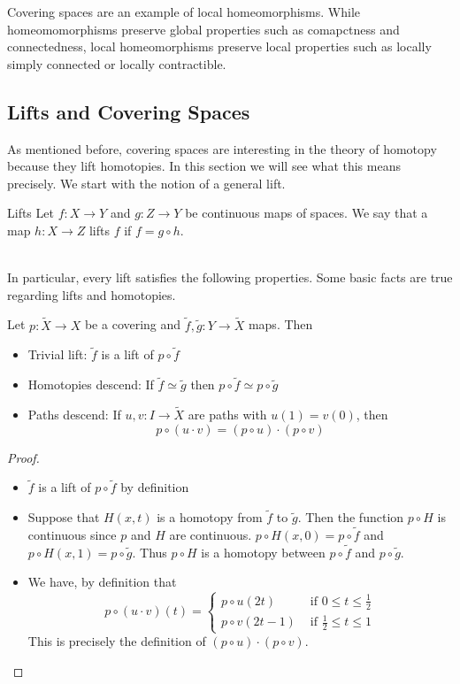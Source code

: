 \documentclass[a4paper]{article}
\begin{document}
Covering spaces are an example of local homeomorphisms. While homeomomorphisms preserve global properties such as comapctness and connectedness, local homeomorphisms preserve local properties such as locally simply connected or locally contractible. 

\subsection{Lifts and Covering Spaces}
As mentioned before, covering spaces are interesting in the theory of homotopy because they lift homotopies. In this section we will see what this means precisely. We start with the notion of a general lift. 

\begin{defn}{Lifts}{} Let $f:X\to Y$ and $g:Z\to Y$ be continuous maps of spaces. We say that a map $h:X\to Z$ lifts $f$ if $f=g\circ h$. \\~\\
\end{defn}

In particular, every lift satisfies the following properties. Some basic facts are true regarding lifts and homotopies. 

\begin{prp}{}{} Let $p:\tilde{X}\to X$ be a covering and $\tilde{f},\tilde{g}:Y\to\tilde{X}$ maps. Then 
\begin{itemize}
\item Trivial lift: $\tilde{f}$ is a lift of $p\circ\tilde{f}$
\item Homotopies descend: If $\tilde{f}\simeq\tilde{g}$ then $p\circ\tilde{f}\simeq p\circ\tilde{g}$
\item Paths descend: If $u,v:I\to\tilde{X}$ are paths with $u(1)=v(0)$, then $$p\circ(u\cdot v)=(p\circ u)\cdot(p\circ v)$$
\end{itemize} \tcbline
\begin{proof}~\\
\begin{itemize}
\item $\tilde{f}$ is a lift of $p\circ\tilde{f}$ by definition
\item Suppose that $H(x,t)$ is a homotopy from $\tilde{f}$ to $\tilde{g}$. Then the function $p\circ H$ is continuous since $p$ and $H$ are continuous. $p\circ H(x,0)=p\circ\tilde{f}$ and $p\circ H(x,1)=p\circ\tilde{g}$. Thus $p\circ H$ is a homotopy between $p\circ\tilde{f}$ and $p\circ\tilde{g}$. 
\item We have, by definition that $$p\circ(u\cdot v)(t)=\begin{cases}
p\circ u(2t) & \text{ if }0\leq t\leq\frac{1}{2}\\
p\circ v(2t-1) & \text{ if }\frac{1}{2}\leq t\leq 1
\end{cases}$$
This is precisely the definition of $(p\circ u)\cdot(p\circ v)$. 
\end{itemize}
\end{proof}
\end{prp}
\end{document}
